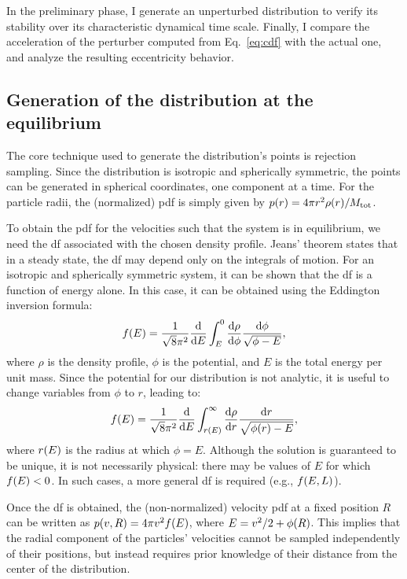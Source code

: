 \documentclass[twocolumn, a4paper]{article}
\begin{document}
In the preliminary phase, I generate an unperturbed distribution to verify its stability over its characteristic dynamical time scale. Finally, I compare the acceleration of the perturber computed from Eq.~\ref{eq:cdf} with the actual one, and analyze the resulting eccentricity behavior.

\subsection{Generation of the distribution at the equilibrium} \label{sec:equilibrium_dist}

The core technique used to generate the distribution's points is rejection sampling. Since the distribution is isotropic and spherically symmetric, the points can be generated in spherical coordinates, one component at a time. For the particle radii, the (normalized) \acrfull{pdf} is simply given by \(p\qty(r) = 4 \pi r^2 \rho\qty(r) / M_\text{tot}\).

To obtain the \acrshort{pdf} for the velocities such that the system is in equilibrium, we need the \acrfull{df} associated with the chosen density profile. Jeans’ theorem states that in a steady state, the \acrshort{df} may depend only on the integrals of motion. For an isotropic and spherically symmetric system, it can be shown that the \acrshort{df} is a function of energy alone. In this case, it can be obtained using the Eddington inversion formula:
\begin{equation}
    f\qty(E) = \dfrac{1}{\sqrt{8}\pi^2} \dv{E} \int_E^0 \dv{\rho}{\phi} \dfrac{\dd{\phi}}{\sqrt{\phi - E}}
    \label{eq:edd_inv_phi},
\end{equation}
where \(\rho\) is the density profile, \(\phi\) is the potential, and \(E\) is the total energy per unit mass. Since the potential for our distribution is not analytic, it is useful to change variables from \(\phi\) to \(r\), leading to:
\begin{equation}
    f\qty(E) = \dfrac{1}{\sqrt{8}\pi^2} \dv{E} \int_{r(E)}^\infty \dv{\rho}{r} \dfrac{\dd{r}}{\sqrt{\phi(r) - E}}
    \label{eq:edd_inv_r},
\end{equation}
where \(r\qty(E)\) is the radius at which \(\phi = E\). Although the solution is guaranteed to be unique, it is not necessarily physical: there may be values of \(E\) for which \(f\qty(E) < 0\). In such cases, a more general \acrshort{df} is required (e.g., \(f\qty(E, L)\)).

Once the \acrshort{df} is obtained, the (non-normalized) velocity \acrshort{pdf} at a fixed position \(R\) can be written as \(p\qty(v, R) = 4 \pi v^2 f\qty(E)\), where \(E = v^2/2 + \phi\qty(R)\). This implies that the radial component of the particles' velocities cannot be sampled independently of their positions, but instead requires prior knowledge of their distance from the center of the distribution.
\end{document}
